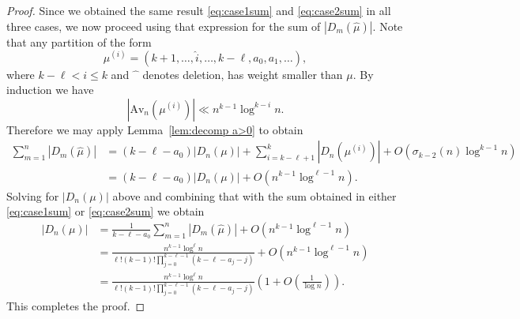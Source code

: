 \documentclass{article}
\theoremstyle{plain}
\theoremstyle{definition}
\newcommand{\Av}{\text{Av}}
\begin{document}
\begin{proof}
Since we obtained the same result \eqref{eq:case1sum} and \eqref{eq:case2sum} in all three cases, we now proceed using that expression for the sum of $|D_m(\hat \mu)|$. Note that any partition of the form
$$\mu^{(i)} = (k+1, \ldots, \widehat i,\ldots, k-\ell, a_0, a_1,\ldots),$$ 
where $k-\ell < i \leq k$ and $\widehat{\phantom{x}}$ denotes deletion, has weight smaller than $\mu$.  By induction we have $$\left|\Av_n\left(\mu^{(i)}\right)\right| \ll n^{k-1}\log^{k-i}n.$$  Therefore we may apply Lemma~\ref{lem:decomp a>0} to obtain
\begin{align*} 
\sum_{m=1}^n |D_{m}(\hat\mu)| &= (k-\ell-a_0)|D_n(\mu)| + \sum_{i=k-\ell+1}^k |D_n(\mu^{(i)})| + O\left(\sigma_{k-2}(n)\log^{k-1} n \right) \\
&= (k-\ell-a_0)|D_n(\mu)| + 
    O\left(n^{k-1}\log^{\ell-1} n\right). 
\end{align*}
Solving for $|D_n(\mu)|$ above and combining that with the sum obtained in either \eqref{eq:case1sum} or \eqref{eq:case2sum} we obtain
\begin{align*}
    |D_n(\mu)| &= 
\frac{1}{k-\ell-a_0} \sum_{m=1}^n |D_m(\hat\mu)|  + 
    O\left(n^{k-1}\log^{\ell-1} n\right) \\
&=\frac{n^{k-1}\log^{\ell}n}{\ell!(k-1)!
    \prod_{j=0}^{k-\ell-1}\left(k-\ell -a_j-j\right)}
+ O\left(n^{k-1}\log^{\ell-1} n\right)\\
&=\frac{n^{k-1}\log^{\ell}n}{\ell!(k-1)!
    \prod_{j=0}^{k-\ell-1}\left(k-\ell -a_j-j\right)}
    \left(1+ O\left(\frac{1}{\log n}\right)\right).
\end{align*}
This completes the proof.  
\end{proof}
\end{document}
